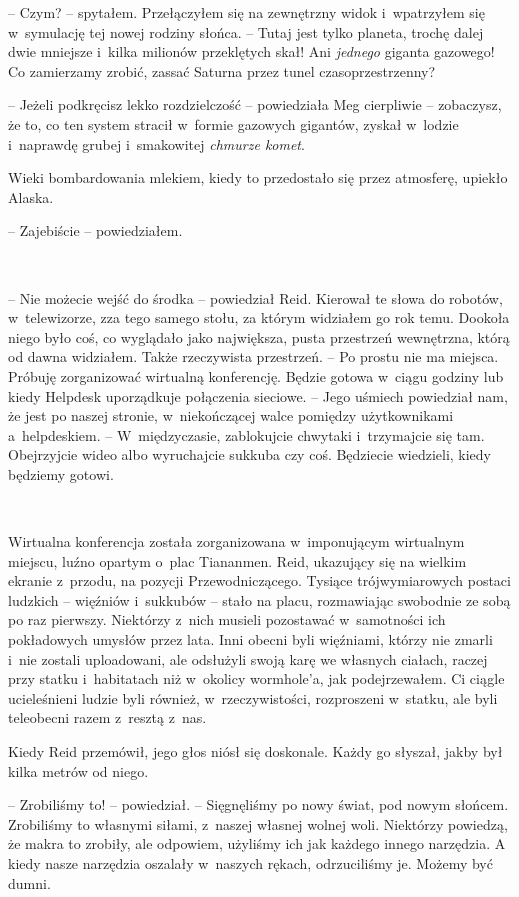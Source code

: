 \documentclass[oneside,polish,11pt,sfheadings]{mwbk}
\begin{document}
-- Czym? -- spytałem. Przełączyłem się na zewnętrzny widok i~wpatrzyłem
się w~symulację tej nowej rodziny słońca. -- Tutaj jest tylko planeta,
trochę dalej dwie mniejsze i~kilka milionów przeklętych skał! Ani
\emph{jednego} giganta gazowego! Co zamierzamy zrobić, zassać Saturna
przez tunel czasoprzestrzenny?

-- Jeżeli podkręcisz lekko rozdzielczość -- powiedziała Meg cierpliwie -- zobaczysz, że to, co ten system stracił w~formie gazowych gigantów,
zyskał w~lodzie i~naprawdę grubej i~smakowitej \emph{chmurze komet}.

Wieki bombardowania mlekiem, kiedy to przedostało się przez atmosferę,
upiekło Alaska.

-- Zajebiście -- powiedziałem.

~

-- Nie możecie wejść do środka -- powiedział Reid. Kierował te słowa do
robotów, w~telewizorze, zza tego samego stołu, za którym widziałem go
rok temu. Dookoła niego było coś, co wyglądało jako największa, pusta
przestrzeń wewnętrzna, którą od dawna widziałem. Także rzeczywista
przestrzeń. -- Po prostu nie ma miejsca. Próbuję zorganizować wirtualną
konferencję. Będzie gotowa w~ciągu godziny lub kiedy Helpdesk
uporządkuje połączenia sieciowe. -- Jego uśmiech powiedział nam, że jest
po naszej stronie, w~niekończącej walce pomiędzy użytkownikami a~helpdeskiem. -- W~międzyczasie, zablokujcie chwytaki i~trzymajcie się
tam. Obejrzyjcie wideo albo wyruchajcie sukkuba czy coś. Będziecie
wiedzieli, kiedy będziemy gotowi.

~

Wirtualna konferencja została zorganizowana w~imponującym wirtualnym
miejscu, luźno opartym o~plac Tiananmen. Reid, ukazujący się na wielkim
ekranie z~przodu, na pozycji Przewodniczącego. Tysiące trójwymiarowych
postaci ludzkich -- więźniów i~sukkubów -- stało na placu, rozmawiając
swobodnie ze sobą po raz pierwszy. Niektórzy z~nich musieli pozostawać w~samotności ich pokładowych umysłów przez lata. Inni obecni byli
więźniami, którzy nie zmarli i~nie zostali uploadowani, ale odsłużyli
swoją karę we własnych ciałach, raczej przy statku i~habitatach niż w~okolicy wormhole'a, jak podejrzewałem. Ci ciągle ucieleśnieni ludzie
byli również, w~rzeczywistości, rozproszeni w~statku, ale byli
teleobecni razem z~resztą z~nas.

Kiedy Reid przemówił, jego głos niósł się doskonale. Każdy go słyszał,
jakby był kilka metrów od niego.

-- Zrobiliśmy to! -- powiedział. -- Sięgnęliśmy po nowy świat, pod nowym
słońcem. Zrobiliśmy to własnymi siłami, z~naszej własnej wolnej woli.
Niektórzy powiedzą, że makra to zrobiły, ale odpowiem, użyliśmy ich jak
każdego innego narzędzia. A kiedy nasze narzędzia oszalały w~naszych
rękach, odrzuciliśmy je. Możemy być dumni.
\end{document}
